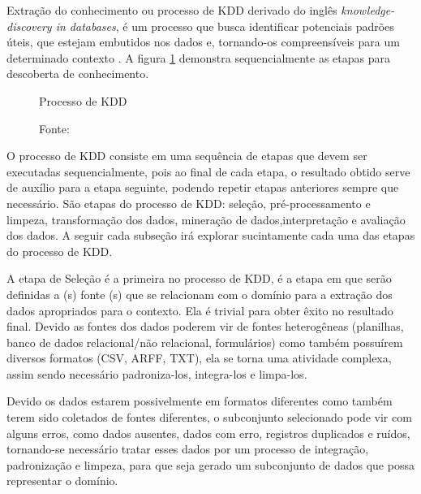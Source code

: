 \label{sec:extracao}

Extração do conhecimento ou processo de KDD derivado do inglês \textit{knowledge- discovery in databases}, é um processo que busca identificar potenciais padrões úteis, que estejam embutidos nos dados e, tornando-os compreensíveis para um determinado contexto \cite{fayyad1996knowledge}. A figura \ref{fig:processokdd} demonstra sequencialmente as etapas para descoberta de conhecimento.

\begin{figure}[!ht]
\caption{Processo de KDD}
\centering
{}
\caption*{Fonte: \cite{fayyad1996knowledge}}
\label{fig:processokdd}
\end{figure}

O processo de KDD consiste em uma sequência de etapas que devem ser executadas sequencialmente, pois ao final de cada etapa, o resultado obtido serve de auxílio para a etapa seguinte, podendo repetir etapas anteriores sempre que necessário. São etapas do processo de KDD: seleção, pré-processamento e limpeza, transformação dos dados, mineração de dados,interpretação e avaliação dos dados. A seguir cada subseção irá explorar sucintamente cada uma das etapas do processo de KDD.


A etapa de Seleção é a primeira no processo de KDD, é a etapa em que serão definidas a (s) fonte (s) que se relacionam com o domínio para a extração dos dados apropriados para o contexto. Ela é trivial para obter êxito no resultado final. Devido as fontes dos dados poderem vir de fontes heterogêneas (planilhas, banco de dados relacional/não relacional, formulários) como também possuírem diversos formatos (CSV, ARFF, TXT), ela se torna uma atividade complexa, assim sendo necessário padroniza-los, integra-los e limpa-los.


Devido os dados estarem possivelmente em formatos diferentes como também terem sido coletados de fontes diferentes, o subconjunto selecionado pode vir com alguns erros, como dados ausentes, dados com erro, registros duplicados e ruídos, tornando-se necessário tratar esses dados por um processo de integração, padronização e limpeza, para que seja gerado um subconjunto de dados que possa representar o domínio.

